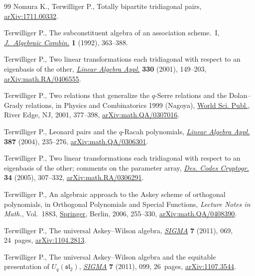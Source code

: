 \documentclass[pdftex]{sigma}
\numberwithin{equation}{section}
\begin{document}
\begin{thebibliography}{99}
Nomura K., Terwilliger P., Totally bipartite tridiagonal pairs,
 \href{https://arxiv.org/abs/1711.00332}{arXiv:1711.00332}.

Terwilliger P., The subconstituent algebra of an association scheme.~{I},
 \href{https://doi.org/10.1023/A:1022494701663}{\textit{J.~Algebraic Combin.}} \textbf{1} (1992), 363--388.

Terwilliger P., Two linear transformations each tridiagonal with respect to an
 eigenbasis of the other, \href{https://doi.org/10.1016/S0024-3795(01)00242-7}{\textit{Linear Algebra Appl.}} \textbf{330} (2001),
 149--203, \href{https://arxiv.org/abs/math.RA/0406555}{arXiv:math.RA/0406555}.

Terwilliger P., Two relations that generalize the {$q$}-{S}erre relations and
 the {D}olan--{G}rady relations, in Physics and Combinatorics 1999 ({N}agoya),
 \href{https://doi.org/10.1142/9789812810199_0013}{World Sci. Publ.}, River Edge, NJ, 2001, 377--398, \href{https://arxiv.org/abs/math.QA/0307016}{arXiv:math.QA/0307016}.

Terwilliger P., Leonard pairs and the {$q$}-{R}acah polynomials, \href{https://doi.org/10.1016/j.laa.2004.02.014}{\textit{Linear
 Algebra Appl.}} \textbf{387} (2004), 235--276, \href{https://arxiv.org/abs/math.QA/0306301}{arXiv:math.QA/0306301}.

Terwilliger P., Two linear transformations each tridiagonal with respect to an
 eigenbasis of the other; comments on the parameter array, \href{https://doi.org/10.1007/s10623-004-4862-7}{\textit{Des. Codes
 Cryptogr.}} \textbf{34} (2005), 307--332, \href{https://arxiv.org/abs/math.RA/0306291}{arXiv:math.RA/0306291}.

Terwilliger P., An algebraic approach to the {A}skey scheme of orthogonal
 polynomials, in Orthogonal Polynomials and Special Functions, \textit{Lecture
 Notes in Math.}, Vol.~1883, \href{https://doi.org/10.1007/978-3-540-36716-1_6}{Springer}, Berlin, 2006, 255--330,
 \href{https://arxiv.org/abs/math.QA/0408390}{arXiv:math.QA/0408390}.

Terwilliger P., The universal {A}skey--{W}ilson algebra, \href{https://doi.org/10.3842/SIGMA.2011.069}{\textit{SIGMA}}
 \textbf{7} (2011), 069, 24~pages, \href{https://arxiv.org/abs/1104.2813}{arXiv:1104.2813}.

Terwilliger P., The universal {A}skey--{W}ilson algebra and the equitable
 presentation of {$U_q(\mathfrak{sl}_2)$}, \href{https://doi.org/10.3842/sigma.2011.099}{\textit{SIGMA}} \textbf{7} (2011),
 099, 26~pages, \href{https://arxiv.org/abs/1107.3544}{arXiv:1107.3544}.


\end{thebibliography}
\end{document}
